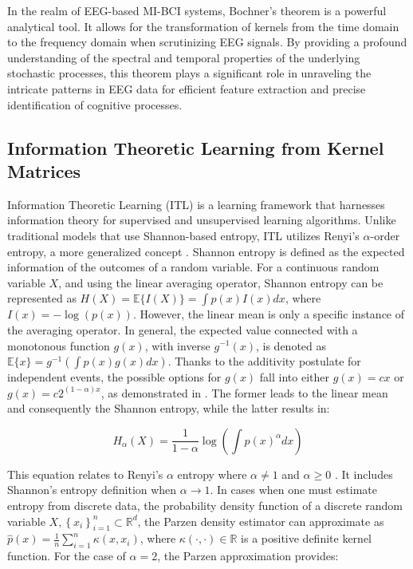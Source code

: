 In the realm of EEG-based MI-BCI systems, Bochner's theorem is a powerful analytical tool. It allows for the transformation of kernels from the time domain to the frequency domain when scrutinizing EEG signals. By providing a profound understanding of the spectral and temporal properties of the underlying stochastic processes, this theorem plays a significant role in unraveling the intricate patterns in EEG data for efficient feature extraction and precise identification of cognitive processes.

\subsection{Information Theoretic Learning from Kernel Matrices}
Information Theoretic Learning (ITL) is a learning framework that harnesses information theory for supervised and unsupervised learning algorithms. Unlike traditional models that use Shannon-based entropy, ITL utilizes Renyi's $\alpha$-order entropy, a more generalized concept \cite{li2020fast}. Shannon entropy is defined as the expected information of the outcomes of a random variable. For a continuous random variable $X$, and using the linear averaging operator, Shannon entropy can be represented as $H(X)=\mathbb{E}\{I(X)\}=\int p(x) I(x) d x$, where $I(x)=-\log (p(x))$. However, the linear mean is only a specific instance of the averaging operator. In general, the expected value connected with a monotonous function $g(x)$, with inverse $g^{-1}(x)$, is denoted as $\mathbb{E}\{x\}=g^{-1}\left(\int p(x) g(x) d x\right)$. Thanks to the additivity postulate for independent events, the possible options for $g(x)$ fall into either $g(x)=c x$ or $g(x)=c 2^{(1-\alpha) x}$, as demonstrated in \cite{renyi1961measures}. The former leads to the linear mean and consequently the Shannon entropy, while the latter results in:

\begin{equation}\label{eq:renyiint}
    H_{\alpha}(X)=\frac{1}{1-\alpha} \log \left(\int p(x)^{\alpha} d x\right) 
\end{equation}

This equation relates to Renyi's $\alpha$ entropy where $\alpha \neq 1$ and $\alpha \geq 0$ \cite{principe2010information,renyi1961measures}. It includes Shannon's entropy definition when $\alpha \rightarrow 1$. In cases when one must estimate entropy from discrete data, the probability density function of a discrete random variable $X,\left\{x_{i}\right\}_{i=1}^{n} \subset \mathbb{R}^{d}$, the Parzen density estimator can approximate as $\hat{p}(x)=\frac{1}{n} \sum_{i=1}^{n} \kappa\left(x, x_{i}\right)$, where $\kappa(\cdot, \cdot) \in \mathbb{R}$ is a positive definite kernel function. For the case of $\alpha=2$, the Parzen approximation provides:

